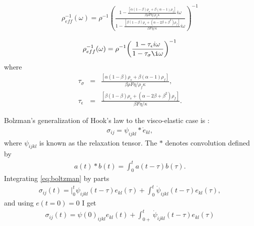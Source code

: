 \documentclass[11pt]{article}
\begin{document}
\begin{eqnarray}
  \rho^{-1}_{eff}(\omega) = 
\rho^{-1} {\left( 
              \frac{1-\frac{[\alpha(1-\beta)\rho_s + \beta(\alpha-1)\rho_f]}{\beta\rho F \eta/ \rho_f \kappa}i\omega 
              }
              {1-\frac{[\beta(1-\beta)\rho_s + (\alpha -2\beta+\beta^2)\rho_f]}{\beta F \eta/ \kappa} i\omega
              }
       \right)}^{-1}
\end{eqnarray}

\begin{eqnarray}
  \rho^{-1}_{eff}(\omega) = 
\rho^{-1} {\left( 
              \frac{1-\tau_{\epsilon}i\omega} 
                   {1-\tau_{\sigma}\i\omega}
       \right)}^{-1}
\end{eqnarray}
where
\begin{eqnarray}
  \tau_{\sigma}   & = &\frac{[\alpha(1-\beta)\rho_s + \beta(\alpha-1)\rho_f]}
                            {\beta\rho F \eta/ \rho_f \kappa}, \nonumber\\
 \tau_{\epsilon} & = &\frac{[\beta(1-\beta)\rho_s + (\alpha -2\beta+\beta^2)\rho_f]}
                           {\beta F \eta/ \kappa}. 
\end{eqnarray}

Bolzman's generalization of Hook's law to the visco-elastic case is
\citep{Hudson1985}:
\begin{eqnarray}
\sigma_{ij} = \psi_{ijkl}*\dot{e}_{kl},
                  \label{eq:boltzman}
\end{eqnarray}where $\psi_{ijkl}$ is known as the relaxation tensor.
The $*$ denotes convolution defined by
\begin{eqnarray}
a(t)*b(t)=\int_0^t a(t-\tau)b(\tau).
\end{eqnarray}
Integrating \eqref{eq:boltzman} by parts
\begin{eqnarray}
\sigma_{ij}(t)=|_0^t \psi_{ijkl}(t-\tau)e_{kl}(\tau) +\int_0^t \dot{\psi}_{ijkl}(t-\tau)e_{kl}(\tau),
\end{eqnarray}
and using $e(t=0)=0$ I get
\begin{eqnarray}
\sigma_{ij}(t)=\psi(0)_{ijkl}e_{kl}(t) +\int_{0+}^t \dot{\psi}_{ijkl}(t-\tau)e_{kl}(\tau)
\end{eqnarray}
\end{document}
